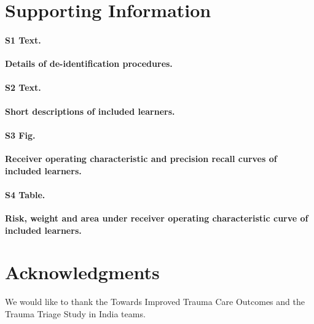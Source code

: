 \documentclass[10pt,letterpaper]{article}\usepackage[]{graphicx}\usepackage[]{color}
\begin{document}
\section*{Supporting Information}

\paragraph*{S1 Text.}
\label{S1_Text}
{\bf Details of de-identification procedures.}

\paragraph*{S2 Text.}
\label{S2_Text}
{\bf Short descriptions of included learners.}

\paragraph*{S3 Fig.}
\label{S3_Fig}
{\bf Receiver operating characteristic and precision recall curves of included learners.}

\paragraph*{S4 Table.}
\label{S4_Table}
{\bf Risk, weight and area under receiver operating characteristic curve of included learners.}



\section*{Acknowledgments}
We would like to thank the Towards Improved Trauma Care Outcomes and the Trauma
Triage Study in India teams.

\nolinenumbers

%
%
% 

\end{document}
